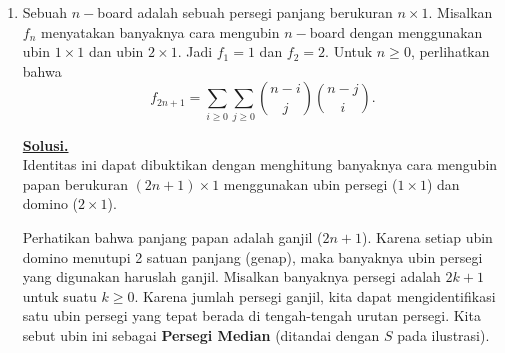 \documentclass[12pt,twoside]{article}
\newenvironment{solution}
{
	\par\noindent\textbf{\underline{Solusi.}}\\
}
{
	\par
}
\begin{document}
\begin{enumerate}
\begin{solution}
          \textbf{Bukti:}
          Kita periksa hasil kali $C = AB$.
          Elemen $c_{ij} = \sum_{k=1}^n a_{ik} b_{kj}$.
          Untuk $1 \le j < n$, kolom ke-$j$ dari $B$ hanya memiliki elemen tak nol di baris $j-1, j, j+1$ (jika ada).
          \[ c_{ij} = -a_{i,j-1} + 2a_{i,j} - a_{i,j+1} \quad (\text{dengan asumsi } a_{i,0}=0). \]
          Substitusi $a_{xy} = \min(x,y)$:
          \begin{itemize}
            \item Jika $i < j$: Maka $i \le j-1$, sehingga $a_{i,j-1}=i, a_{i,j}=i, a_{i,j+1}=i$.
                  Hasilnya $-i + 2i - i = 0$.
            \item Jika $i > j$: Maka $j < i$, sehingga $j-1 < i$ dan $j+1 \le i$ (biasanya).
                  $a_{i,j-1}=j-1, a_{i,j}=j, a_{i,j+1}=j+1$.
                  Hasilnya $-(j-1) + 2j - (j+1) = -j+1+2j-j-1 = 0$.
            \item Jika $i = j$: Maka $c_{ii} = -a_{i,i-1} + 2a_{i,i} - a_{i,i+1} = -(i-1) + 2i - i = i+1 - i = 1$.
          \end{itemize}

          Untuk kolom terakhir $j=n$, $c_{in} = -a_{i,n-1} + a_{i,n}$.
          \begin{itemize}
            \item Jika $i < n$: $a_{i,n-1}=i$ dan $a_{i,n}=i$. Hasilnya $-i+i=0$.
            \item Jika $i = n$: $a_{n,n-1}=n-1$ dan $a_{n,n}=n$. Hasilnya $-(n-1)+n=1$.
          \end{itemize}
          Jadi $AB = I$, sehingga $B = A^{-1}$.
        \end{solution}

  \item Sebuah $n-$board adalah sebuah persegi panjang berukuran $n\times 1$. Misalkan $f_n$ menyatakan banyaknya cara mengubin $n-$board dengan menggunakan ubin $1\times 1$ dan ubin $2\times 1$. Jadi $f_1=1$ dan $f_2=2$. Untuk $n\geq 0$, perlihatkan bahwa
        $$f_{2n+1}=\sum_{i\geq 0}\sum_{j\geq 0}\binom{n-i}{j}\binom{n-j}{i}.$$
        \begin{solution}
          Identitas ini dapat dibuktikan dengan menghitung banyaknya cara mengubin papan berukuran $(2n+1)\times 1$ menggunakan ubin persegi ($1\times 1$) dan domino ($2\times 1$).

          Perhatikan bahwa panjang papan adalah ganjil ($2n+1$). Karena setiap ubin domino menutupi 2 satuan panjang (genap), maka banyaknya ubin persegi yang digunakan haruslah ganjil.
          Misalkan banyaknya persegi adalah $2k+1$ untuk suatu $k \ge 0$.
          Karena jumlah persegi ganjil, kita dapat mengidentifikasi satu ubin persegi yang tepat berada di tengah-tengah urutan persegi. Kita sebut ubin ini sebagai \textbf{Persegi Median} (ditandai dengan $S$ pada ilustrasi).


\end{solution}
\end{enumerate}
\end{document}
